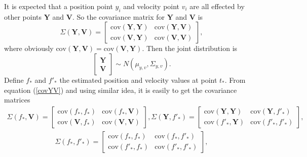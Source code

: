 It is expected that a position point $y_i$ and velocity point $v_i$ are all effected by other points $\mathbf{Y}$ and $\mathbf{V}$. So the covariance matrix for $\mathbf{Y}$ and $\mathbf{V}$ is
\begin{equation}\label{covYV}
\Sigma(\mathbf{Y},\mathbf{V}) = 
\left[
\begin{matrix}
\text{cov}(\mathbf{Y},\mathbf{Y}) & \text{cov}(\mathbf{Y},\mathbf{V}) \\
\text{cov}(\mathbf{V},\mathbf{Y}) & \text{cov}(\mathbf{V},\mathbf{V}) 
\end{matrix}\right],
\end{equation}
where obviously $\text{cov}(\mathbf{Y},\mathbf{V}) =\text{cov}(\mathbf{V},\mathbf{Y})$. Then the joint distribution  is 
\begin{equation*}
\left[
\begin{matrix}
\mathbf{Y}\\
\mathbf{V}
\end{matrix}
\right] \sim N(\mu_{y,v},\Sigma_{y,v}).
\end{equation*}
Define $f_*$ and $f'_*$ the estimated position and velocity values at point $t_*$. From equation (\ref{covYV}) and using similar idea, it is easily to get the covariance matrices 
\begin{align*}
\Sigma(f_*,\mathbf{V}) = 
\left[
\begin{matrix}
\text{cov}(f_*,f_*) & \text{cov}(f_*,\mathbf{V}) \\
\text{cov}(\mathbf{V},f_*) & \text{cov}(\mathbf{V},\mathbf{V}) 
\end{matrix}\right],
\Sigma(\mathbf{Y},f'_*) = 
\left[
\begin{matrix}
\text{cov}(\mathbf{Y},\mathbf{Y}) & \text{cov}(\mathbf{Y},f'_*) \\
\text{cov}(f'_*,\mathbf{Y}) & \text{cov}(f'_*,f'_*) 
\end{matrix}\right],
\end{align*}
\begin{align*}
\Sigma(f_*,f'_*) = 
\left[
\begin{matrix}
\text{cov}(f_*,f_*) & \text{cov}(f_*,f'_*) \\
\text{cov}(f'_*,f_*) & \text{cov}(f'_*,f'_*) 
\end{matrix}\right],
\end{align*}




